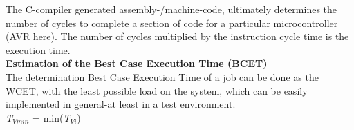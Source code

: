 The C-compiler generated assembly-/machine-code, ultimately determines the number of cycles to complete a section of code for a particular microcontroller (AVR here). The number of cycles multiplied by the instruction cycle time is the execution time.\\

{\rot\bf Estimation of the Best Case Execution Time (BCET)}\\

The determination Best Case Execution Time of a job can be done as the WCET, with the least possible load on the system, which can be easily implemented in general-at least in a test environment.\\

\textit{T${}_{Vmin}$} = min(\textit{T${}_{Vi}$})


